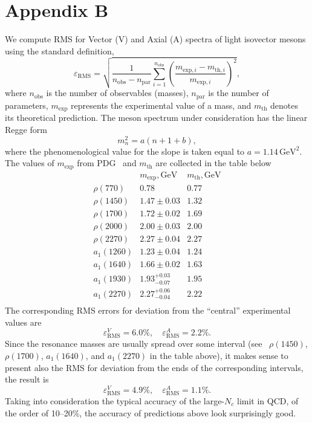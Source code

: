 \documentclass[a4paper,11pt]{article}
\newcommand{\lb}[0]{\left(}
\newcommand{\rb}[0]{\right)}
\begin{document}
\section*{Appendix B}

We compute RMS for Vector (V) and Axial (A) spectra of light isovector mesons using the standard definition,
\begin{equation}
    \varepsilon_\text{RMS}=\sqrt{\frac{1}{n_\text{obs}-n_\text{par}}\sum_{i=1}^{n_\text{obs}}\lb\frac{m_{\text{exp},i}-m_{\text{th},i}}{m_{\text{exp},i}}\rb^2},
\end{equation}
where \(n_\text{obs}\) is the number of observables (masses), \(n_\text{par}\) is the number of
parameters, \(m_\text{exp}\) represents the experimental value of a mass, and \(m_\text{th}\) denotes
its theoretical prediction. The meson spectrum under consideration has the linear Regge form
\begin{equation}
  m_n^2=a(n+1+b),
\end{equation}
where the phenomenological value for the slope is taken equal to \(a=1.14\,\text{GeV}^2\).
The values of \(m_\text{exp}\) from PDG~\cite{pdg} and \(m_\text{th}\) are collected in the table below
\[\begin{array}{c|c|c}
  & m_\text{exp}, \text{GeV} & m_\text{th}, \text{GeV} \\
  \hline
  \rho(770)  & 0.78 & 0.77 \\
  \rho(1450) & 1.47\pm 0.03 & 1.32 \\
  \rho(1700) & 1.72\pm 0.02 & 1.69 \\
  \rho(2000) & 2.00\pm 0.03 & 2.00 \\
  \rho(2270) & 2.27\pm 0.04 & 2.27 \\
  \hline\hline
  a_1(1260) & 1.23\pm 0.04 & 1.24 \\
  a_1(1640) & 1.66\pm 0.02 & 1.63 \\
  a_1(1930) & 1.93^{+0.03}_{-0.07} & 1.95 \\
  a_1(2270) & 2.27^{+0.06}_{-0.04} & 2.22 \\
\end{array}\]
The corresponding RMS errors for deviation from the ``central'' experimental values are
\begin{equation}
  \varepsilon^V_\text{RMS}=6.0\%,\quad
  \varepsilon^{A}_\text{RMS}=2.2\%.
\end{equation}
Since the resonance masses are usually spread over some interval
(see ~\(\rho(1450)\), \(\rho(1700)\), \(a_1(1640)\), and \(a_1(2270)\) in the table above), it makes sense to present also
the RMS for deviation from the ends of the corresponding intervals, the result is
\begin{equation}
  \varepsilon^V_\text{RMS}=4.9\%,\quad
  \varepsilon^{A}_\text{RMS}=1.1\%.
\end{equation}
Taking into consideration the typical accuracy of the large-$N_c$ limit in QCD, of the order of 10--20\%,
the accuracy of predictions above look surprisingly good.
\end{document}
